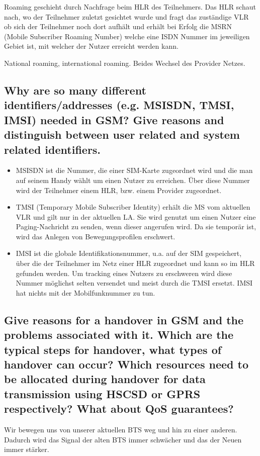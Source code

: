Roaming geschieht durch Nachfrage beim HLR des Teilnehmers. Das HLR schaut nach, wo der Teilnehmer zuletzt gesichtet wurde und fragt das zuständige VLR ob sich der Teilnehmer noch dort aufhält und erhält bei Erfolg die MSRN (Mobile Subscriber Roaming Number) welche eine ISDN Nummer im jeweiligen Gebiet ist, mit welcher der Nutzer erreicht werden kann. 

National roaming, international roaming. Beides Wechsel des Provider Netzes.


\subsection{Why are so many different identifiers/addresses (e.g. MSISDN, TMSI, IMSI) needed in GSM? Give reasons and distinguish between user related and system related identifiers.}
\begin{itemize}
\item MSISDN ist die Nummer, die einer SIM-Karte zugeordnet wird und die man auf seinem Handy wählt um einen Nutzer zu erreichen. Über diese Nummer wird der Teilnehmer einem HLR, bzw. einem Provider zugeordnet.

\item TMSI (Temporary Mobile Subscriber Identity) erhält die MS vom aktuellen VLR und gilt nur in der aktuellen LA. Sie wird genutzt um einen Nutzer eine Paging-Nachricht zu senden, wenn dieser angerufen wird. Da sie temporär ist, wird das Anlegen von Bewegungsprofilen erschwert.

\item IMSI ist die globale Identifikationsnummer, u.a. auf der SIM gespeichert, über die der Teilnehmer im Netz einer HLR zugeordnet und kann so im HLR gefunden werden. Um tracking eines Nutzers zu erschweren wird diese Nummer möglichst selten versendet und meist durch die TMSI ersetzt. IMSI hat nichts mit der Mobilfunknummer zu tun.

\end{itemize}


\subsection{Give reasons for a handover in GSM and the problems associated with it. Which are the typical steps for handover, what types of handover can occur? Which resources need to be allocated during handover for data transmission using HSCSD or GPRS respectively? What about QoS guarantees?}
Wir bewegen uns von unserer aktuellen BTS weg und hin zu einer anderen. Dadurch wird das Signal der alten BTS immer schwächer und das der Neuen immer stärker.

